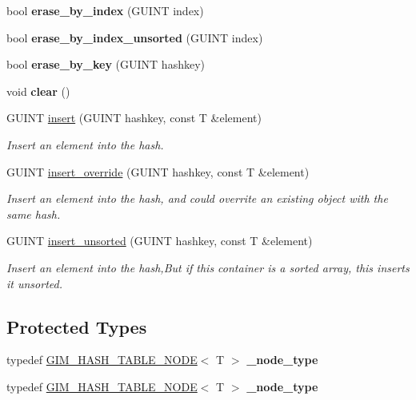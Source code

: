 \begin{DoxyCompactItemize}
bool {\bfseries erase\+\_\+by\+\_\+index} (G\+U\+I\+NT index)
\item 
\mbox{\label{classgim__hash__table_a22cce5d8ed58cfb7e16d6b81aaf5acb7}} 
bool {\bfseries erase\+\_\+by\+\_\+index\+\_\+unsorted} (G\+U\+I\+NT index)
\item 
\mbox{\label{classgim__hash__table_a156d142f1eb74c3ef758a14fffe1763a}} 
bool {\bfseries erase\+\_\+by\+\_\+key} (G\+U\+I\+NT hashkey)
\item 
\mbox{\label{classgim__hash__table_a1574ca1850a9258db8b778282134ff42}} 
void {\bfseries clear} ()
\item 
G\+U\+I\+NT \hyperlink{classgim__hash__table_aff0e9bdb5bd6aacf9272db6789c514f7}{insert} (G\+U\+I\+NT hashkey, const T \&element)
\begin{DoxyCompactList}\small\item\em Insert an element into the hash. \end{DoxyCompactList}\item 
G\+U\+I\+NT \hyperlink{classgim__hash__table_a83987136757654921c71b183de8ec55e}{insert\+\_\+override} (G\+U\+I\+NT hashkey, const T \&element)
\begin{DoxyCompactList}\small\item\em Insert an element into the hash, and could overrite an existing object with the same hash. \end{DoxyCompactList}\item 
\mbox{\label{classgim__hash__table_abe9a629ec7dfe612065ed9d161adc7e8}} 
G\+U\+I\+NT \hyperlink{classgim__hash__table_abe9a629ec7dfe612065ed9d161adc7e8}{insert\+\_\+unsorted} (G\+U\+I\+NT hashkey, const T \&element)
\begin{DoxyCompactList}\small\item\em Insert an element into the hash,But if this container is a sorted array, this inserts it unsorted. \end{DoxyCompactList}\end{DoxyCompactItemize}
\subsection*{Protected Types}
\begin{DoxyCompactItemize}
\item 
\mbox{\label{classgim__hash__table_a93f9195325cf57b3789e575a18a929a5}} 
typedef \hyperlink{structGIM__HASH__TABLE__NODE}{G\+I\+M\+\_\+\+H\+A\+S\+H\+\_\+\+T\+A\+B\+L\+E\+\_\+\+N\+O\+DE}$<$ T $>$ {\bfseries \+\_\+node\+\_\+type}
\item 
\mbox{\label{classgim__hash__table_a93f9195325cf57b3789e575a18a929a5}} 
typedef \hyperlink{structGIM__HASH__TABLE__NODE}{G\+I\+M\+\_\+\+H\+A\+S\+H\+\_\+\+T\+A\+B\+L\+E\+\_\+\+N\+O\+DE}$<$ T $>$ {\bfseries \+\_\+node\+\_\+type}
\end{DoxyCompactItemize}
